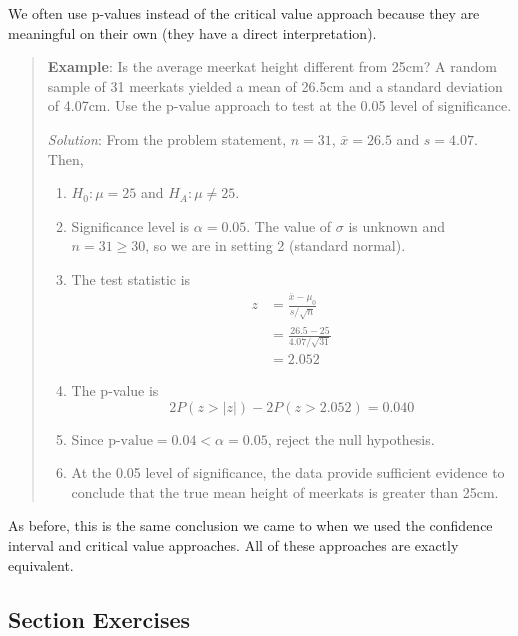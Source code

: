 \documentclass[
]{book}
\providecommand{\tightlist}{%
  \setlength{\itemsep}{0pt}\setlength{\parskip}{0pt}}
\begin{document}
We often use p-values instead of the critical value approach because they are meaningful on their own (they have a direct interpretation).

\begin{quote}
\textbf{Example}: Is the average meerkat height different from 25cm? A random sample of 31 meerkats yielded a mean of 26.5cm and a standard deviation of 4.07cm. Use the p-value approach to test at the 0.05 level of significance.

\emph{Solution}: From the problem statement, \(n=31\), \(\bar{x}=26.5\) and \(s=4.07\). Then,

\begin{enumerate}
\def\labelenumi{\arabic{enumi}.}
\tightlist
\item
  \(H_0: \mu = 25\) and \(H_A: \mu \ne 25\).
\item
  Significance level is \(\alpha=0.05\). The value of \(\sigma\) is unknown and \(n = 31 \ge 30\), so we are in setting 2 (standard normal).
\item
  The test statistic is \begin{align} z &= \frac{\bar{x}-\mu_0}{s/\sqrt{n}} \\ &= \frac{26.5-25}{4.07/\sqrt{31}} \\ &= 2.052 \end{align}
\item
  The p-value is \[2P(z > |z|) - 2P(z > 2.052) = 0.040\]
\item
  Since \(\text{p-value}=0.04 < \alpha=0.05\), reject the null hypothesis.
\item
  At the 0.05 level of significance, the data provide sufficient evidence to conclude that the true mean height of meerkats is greater than 25cm.
\end{enumerate}
\end{quote}

As before, this is the same conclusion we came to when we used the confidence interval and critical value approaches. All of these approaches are exactly equivalent.

\subsection*{Section Exercises}\label{section-exercises-24}
\end{document}
